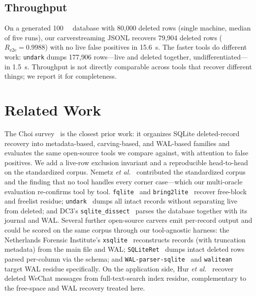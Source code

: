 \documentclass[10pt,a4paper]{article}
\newcommand{\code}[1]{\texttt{#1}}
\newcommand{\sys}{our carver}
\newcommand{\sys}{\texttt{sqlite4n6}}
\begin{document}
\subsection*{Throughput}
On a generated \SI{100}{\mega\byte} database with 80{,}000 deleted rows
(single machine, median of five runs), \sys streaming JSONL recovers
79{,}904 deleted rows ($R_{\mathrm{e2e}}=0.9988$) with no live false positives in
\SI{15.6}{\second}. The faster tools do different work: \code{undark} dumps
177{,}906 rows---live and deleted together, undifferentiated---in
\SI{1.5}{\second}. Throughput is not directly comparable across tools that recover
different things; we report it for completeness.

\section{Related Work}\label{sec:related}

The Choi survey~\cite{choi2025survey} is the closest prior work: it organizes
SQLite deleted-record recovery into metadata-based, carving-based, and WAL-based
families and evaluates the same open-source tools we compare against, with attention
to false positives. We add a live-row exclusion invariant and a reproducible
head-to-head on the standardized corpus. Nemetz \emph{et al.}~\cite{nemetz2018corpus}
contributed the standardized corpus and the finding that no tool handles every
corner case---which our multi-oracle evaluation re-confirms tool by tool.
\code{fqlite}~\cite{pawlaszczyk2021fqlite} and \code{bring2lite}~\cite{meng2019bring2lite}
recover free-block and freelist residue; \code{undark}~\cite{undark} dumps all
intact records without separating live from deleted; and DC3's
\code{sqlite\_dissect}~\cite{sqlite_dissect_dc3} parses the database together with
its journal and WAL. Several further open-source carvers emit per-record output and
could be scored on the same corpus through our tool-agnostic harness: the Netherlands
Forensic Institute's \code{xsqlite}~\cite{xsqlite} reconstructs records (with
truncation metadata) from the main file and WAL; \code{SQLiteRet}~\cite{sqliteret}
dumps intact deleted rows parsed per-column via the schema; and
\code{WAL-parser-sqlite}~\cite{walparser} and \code{walitean}~\cite{walitean} target
WAL residue specifically. On the application side, Hur \emph{et al.}~\cite{hur2020wechat}
recover deleted WeChat messages from full-text-search index residue, complementary
to the free-space and WAL recovery treated here.
\end{document}
